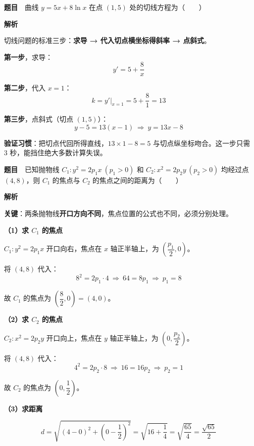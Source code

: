 \par\medskip


\textbf{题目}　曲线 $y=5x+8\ln x$ 在点 $(1,5)$ 处的切线方程为（　　）

\textbf{解析}

切线问题的标准三步：\textbf{求导 → 代入切点横坐标得斜率 → 点斜式}。

\textbf{第一步}，求导：
\[y'=5+\frac{8}{x}\]

\textbf{第二步}，代入 $x=1$：
\[k=y'\big|_{x=1}=5+\frac{8}{1}=13\]

\textbf{第三步}，点斜式（切点 $(1,5)$）：
\[y-5=13(x-1)\ \Longrightarrow\ y=13x-8\]


\begin{gktip}
\textbf{验证习惯}：把切点代回所得直线，$13\times1-8=5$  与切点纵坐标吻合。这一步只需 3 秒，能挡住绝大多数计算失误。
\end{gktip}

\par\medskip


\textbf{题目}　已知抛物线 $C_1:y^2=2p_1x\ (p_1>0)$ 和 $C_2:x^2=2p_2y\ (p_2>0)$ 均经过点 $(4,8)$，则 $C_1$ 的焦点与 $C_2$ 的焦点之间的距离为（　　）

\textbf{解析}

\textbf{关键}：两条抛物线\textbf{开口方向不同}，焦点位置的公式也不同，必须分别处理。

\textbf{（1）求 $C_1$ 的焦点}

$C_1:y^2=2p_1x$ 开口向右，焦点在 $x$ 轴正半轴上，为 $\left(\dfrac{p_1}{2},0\right)$。

将 $(4,8)$ 代入：
\[8^2=2p_1\cdot 4\ \Longrightarrow\ 64=8p_1\ \Longrightarrow\ p_1=8\]

故 $C_1$ 的焦点为 $\left(\dfrac82,0\right)=(4,0)$。

\textbf{（2）求 $C_2$ 的焦点}

$C_2:x^2=2p_2y$ 开口向上，焦点在 $y$ 轴正半轴上，为 $\left(0,\dfrac{p_2}{2}\right)$。

将 $(4,8)$ 代入：
\[4^2=2p_2\cdot 8\ \Longrightarrow\ 16=16p_2\ \Longrightarrow\ p_2=1\]

故 $C_2$ 的焦点为 $\left(0,\dfrac12\right)$。

\textbf{（3）求距离}

\[d=\sqrt{(4-0)^2+\left(0-\frac12\right)^2}=\sqrt{16+\frac14}=\sqrt{\frac{65}{4}}=\frac{\sqrt{65}}{2}\]

